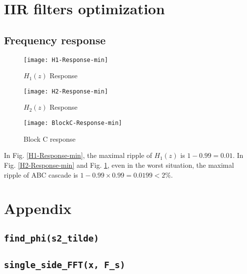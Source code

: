 \documentclass{article}
\newenvironment{homeworkProblem}[1]{
	\section{#1}
	}{
}
\newenvironment{homeworkSection}[1]{
	\subsection{#1}
	}{
}
\begin{document}
\begin{homeworkProblem}{IIR filters optimization}

\begin{homeworkSection}{Frequency response}
\begin{figure}[H]
\begin{minipage}[t]{0.33\linewidth}
\centering
\texttt{[image: H1-Response-min]}
\caption{$H_1(z)$ Response}
\label{H1-Response-min}
\end{minipage}
\begin{minipage}[t]{0.33\linewidth}
\centering
\texttt{[image: H2-Response-min]}
\caption{$H_2(z)$ Response}
\label{H2-Response-min}
\end{minipage}
\begin{minipage}[t]{0.33\linewidth}
\centering
\texttt{[image: BlockC-Response-min]}
\caption{Block C response}
\label{BlockC-Response-min}
\end{minipage}
\end{figure}

In Fig. \ref{H1-Response-min}, the maximal ripple of $H_1(z)$ is $1 - 0.99 = 0.01$. In Fig. \ref{H2-Response-min} and Fig. \ref{BlockC-Response-min}, even in the worst situation, the maximal ripple of ABC cascade is $1 - 0.99 \times 0.99 = 0.0199 < 2\%$.
\end{homeworkSection}


\end{homeworkProblem}


\newpage
\section*{Appendix}

\subsection*{\texttt{find\_phi(s2\_tilde)}}\label{find_phi}


\subsection*{\texttt{single\_side\_FFT(x, F\_s)}}

\end{document}
